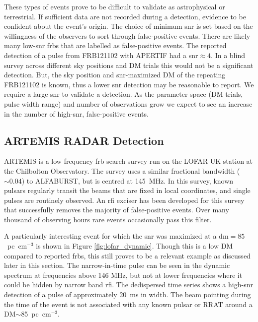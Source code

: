 \documentclass[a4paper,fleqn,usenatbib]{mnras}
\begin{document}
These types of events prove to be difficult to validate as astrophysical or
terrestrial. If sufficient data are not recorded during a detection, evidence to
be confident about the event's origin. The choice of minimum \gls{snr} is set
based on the willingness of the observers to sort through false-positive events.
There are likely many low-\gls{snr} \glspl{frb} that are labelled as
false-positive events.  The reported detection of a pulse from FRB121102 with
APERTIF \citep{atel10693} had a \gls{snr}$\approx 4$. In a blind survey across
different sky positions and DM trials this would not be a significant detection.
But, the sky position and \gls{snr}-maximized DM of the repeating FRB121102 is
known, thus a lower \gls{snr} detection may be reasonable to report.  We require
a large \gls{snr} to validate a detection.  As the parameter space (DM trials,
pulse width range) and number of observations grow we expect to see an increase
in the number of high-\gls{snr}, false-positive events.

\subsection{ARTEMIS RADAR Detection}
\label{sec:LOFAR_RADAR}

ARTEMIS \citep{2015MNRAS.452.1254K} is a low-frequency \gls{frb} search survey
run on the LOFAR-UK station at the Chilbolton Observatory.  The survey uses a
similar fractional bandwidth ($\sim 0.04$) to ALFABURST, but is centred at
145~MHz.  In this survey, known pulsars regularly transit the beams that are
fixed in local coordinates, and single pulses are routinely observed.  An
\gls{rfi} exciser has been developed for this survey that successfully removes
the majority of false-positive events. Over many thousand of observing hours
rare events occasionally pass this filter.

A particularly interesting event for which the \gls{snr} was maximized at a
\gls{dm}$= 85$~pc~cm$^{-3}$ is shown in Figure \ref{fig:lofar_dynamic}. Though
this is a low DM compared to reported \glspl{frb}, this still proves to be a
relevant example as discussed later in this section.  The narrow-in-time pulse
can be seen in the dynamic spectrum at frequencies above 146 MHz, but not at
lower frequencies where it could be hidden by narrow band \gls{rfi}.  The
dedispersed time series shows a high-\gls{snr} detection of a pulse of
approximately 20~ms in width.  The beam pointing during the time of the event is
not associated with any known pulsar or RRAT around a DM$\sim$85~pc~cm$^{-3}$.
\end{document}
